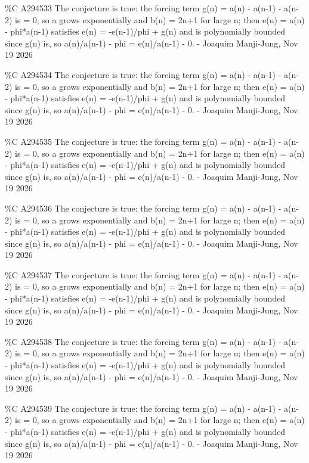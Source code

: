{\%C A294533 The conjecture is true: the forcing term g(n) = a(n) - a(n-1) - a(n-2) is = 0, so a grows exponentially and b(n) = 2n+1 for large n; then e(n) = a(n) - phi*a(n-1) satisfies e(n) = -e(n-1)/phi + g(n) and is polynomially bounded since g(n) is, so a(n)/a(n-1) - phi = e(n)/a(n-1) - 0. - Joaquim Manji-Jung, Nov 19 2026\par
\%C A294534 The conjecture is true: the forcing term g(n) = a(n) - a(n-1) - a(n-2) is = 0, so a grows exponentially and b(n) = 2n+1 for large n; then e(n) = a(n) - phi*a(n-1) satisfies e(n) = -e(n-1)/phi + g(n) and is polynomially bounded since g(n) is, so a(n)/a(n-1) - phi = e(n)/a(n-1) - 0. - Joaquim Manji-Jung, Nov 19 2026\par
\%C A294535 The conjecture is true: the forcing term g(n) = a(n) - a(n-1) - a(n-2) is = 0, so a grows exponentially and b(n) = 2n+1 for large n; then e(n) = a(n) - phi*a(n-1) satisfies e(n) = -e(n-1)/phi + g(n) and is polynomially bounded since g(n) is, so a(n)/a(n-1) - phi = e(n)/a(n-1) - 0. - Joaquim Manji-Jung, Nov 19 2026\par
\%C A294536 The conjecture is true: the forcing term g(n) = a(n) - a(n-1) - a(n-2) is = 0, so a grows exponentially and b(n) = 2n+1 for large n; then e(n) = a(n) - phi*a(n-1) satisfies e(n) = -e(n-1)/phi + g(n) and is polynomially bounded since g(n) is, so a(n)/a(n-1) - phi = e(n)/a(n-1) - 0. - Joaquim Manji-Jung, Nov 19 2026\par
\%C A294537 The conjecture is true: the forcing term g(n) = a(n) - a(n-1) - a(n-2) is = 0, so a grows exponentially and b(n) = 2n+1 for large n; then e(n) = a(n) - phi*a(n-1) satisfies e(n) = -e(n-1)/phi + g(n) and is polynomially bounded since g(n) is, so a(n)/a(n-1) - phi = e(n)/a(n-1) - 0. - Joaquim Manji-Jung, Nov 19 2026\par
\%C A294538 The conjecture is true: the forcing term g(n) = a(n) - a(n-1) - a(n-2) is = 0, so a grows exponentially and b(n) = 2n+1 for large n; then e(n) = a(n) - phi*a(n-1) satisfies e(n) = -e(n-1)/phi + g(n) and is polynomially bounded since g(n) is, so a(n)/a(n-1) - phi = e(n)/a(n-1) - 0. - Joaquim Manji-Jung, Nov 19 2026\par
\%C A294539 The conjecture is true: the forcing term g(n) = a(n) - a(n-1) - a(n-2) is = 0, so a grows exponentially and b(n) = 2n+1 for large n; then e(n) = a(n) - phi*a(n-1) satisfies e(n) = -e(n-1)/phi + g(n) and is polynomially bounded since g(n) is, so a(n)/a(n-1) - phi = e(n)/a(n-1) - 0. - Joaquim Manji-Jung, Nov 19 2026\par
}
